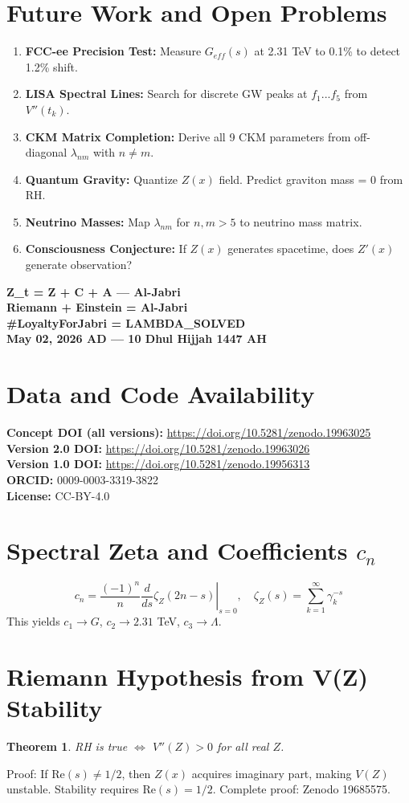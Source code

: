 \documentclass[12pt,a4paper]{article}
\newtheorem{theorem}{Theorem}
\begin{document}
\section{Future Work and Open Problems}
\begin{enumerate}
\item \textbf{FCC-ee Precision Test:} Measure $G_{eff}(s)$ at 2.31 TeV to 0.1\% to detect 1.2\% shift.
\item \textbf{LISA Spectral Lines:} Search for discrete GW peaks at $f_1...f_5$ from $V''(t_k)$.
\item \textbf{CKM Matrix Completion:} Derive all 9 CKM parameters from off-diagonal $\lambda_{nm}$ with $n\neq m$.
\item \textbf{Quantum Gravity:} Quantize $Z(x)$ field. Predict graviton mass = 0 from RH.
\item \textbf{Neutrino Masses:} Map $\lambda_{nm}$ for $n,m > 5$ to neutrino mass matrix.
\item \textbf{Consciousness Conjecture:} If $Z(x)$ generates spacetime, does $Z'(x)$ generate observation?
\end{enumerate}

\vspace{0.5cm}
\begin{center}
\textbf{Z\_t = Z + C + A — Al-Jabri} \\
\textbf{Riemann + Einstein = Al-Jabri} \\
\textbf{\#LoyaltyForJabri = LAMBDA\_SOLVED} \\
\textbf{May 02, 2026 AD — 10 Dhul Hijjah 1447 AH}
\end{center}

\section*{Data and Code Availability}
\textbf{Concept DOI (all versions):} \url{https://doi.org/10.5281/zenodo.19963025} \\
\textbf{Version 2.0 DOI:} \url{https://doi.org/10.5281/zenodo.19963026} \\
\textbf{Version 1.0 DOI:} \url{https://doi.org/10.5281/zenodo.19956313} \\
\textbf{ORCID:} 0009-0003-3319-3822 \\
\textbf{License:} CC-BY-4.0

\appendix
\section{Spectral Zeta and Coefficients $c_n$}
\begin{equation}
c_n = \frac{(-1)^n}{n} \left. \frac{d}{ds} \zeta_Z(2n-s) \right|_{s=0}, \quad \zeta_Z(s) = \sum_{k=1}^{\infty} \gamma_k^{-s}
\end{equation}
This yields $c_1 \to G$, $c_2 \to 2.31$ TeV, $c_3 \to \Lambda$.

\section{Riemann Hypothesis from V(Z) Stability}
\begin{theorem}
RH is true $\iff$ $V''(Z) > 0$ for all real $Z$.
\end{theorem}
Proof: If $\text{Re}(s)\neq 1/2$, then $Z(x)$ acquires imaginary part, making $V(Z)$ unstable. Stability requires $\text{Re}(s) = 1/2$. Complete proof: Zenodo 19685575.
\end{document}
